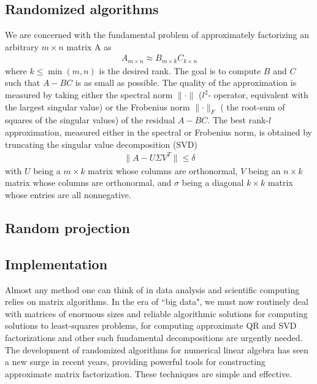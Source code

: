 \documentclass[12pt,letterpaper]{article}
\begin{document}
\subsection{Randomized algorithms}
We are concerned with the fundamental problem of approximately factorizing an arbitrary $m\times n$ matrix A as
\begin{align}
A_{m \times n} \approx B_{m\times k} C_{k\times n} 
\end{align}
where $k \le \min(m,n)$ is the desired rank. The goal is to compute $B$ and $C$ such that $A -BC$ is as small as possible. The 
quality of the approximation is measured by taking either the spectral norm $\parallel \cdot \parallel$ ($l^2$- operator, equivalent 
with the largest singular value) or the Frobenius norm $\parallel \cdot \parallel_F$ ( the root-sum of squares of the singular values) of
the residual $A - BC$. 
The best rank-$l$ approximation, measured either in the spectral or Frobenius norm, is obtained by truncating the singular value
decomposition (SVD)
\begin{align}
\parallel A - U\Sigma V^T\parallel \le \delta
\end{align}
with $U$ being a $m \times k$ matrix whose columns are orthonormal, $V$ being an $n \times k$ matrix whose columns are orthonormal,
and $\sigma$ being a diagonal $k \times k$ matrix whose entries are all nonnegative. 

\subsection{Random projection}

\subsection{Implementation}
Almost any method one can think of in data analysis and scientific computing relies on matrix algorithms. In the era of ``big data", we must now routinely deal with matrices of enormous sizes and reliable algorithmic solutions for computing solutions to least-squares problems, for computing approximate QR and SVD factorizations and other such fundamental decompositions are urgently needed. The development of randomized algorithms for numerical linear algebra has
seen a new surge in recent years, providing powerful tools for constructing approximate matrix factorization. These techniques are simple and effective. 
\end{document}
